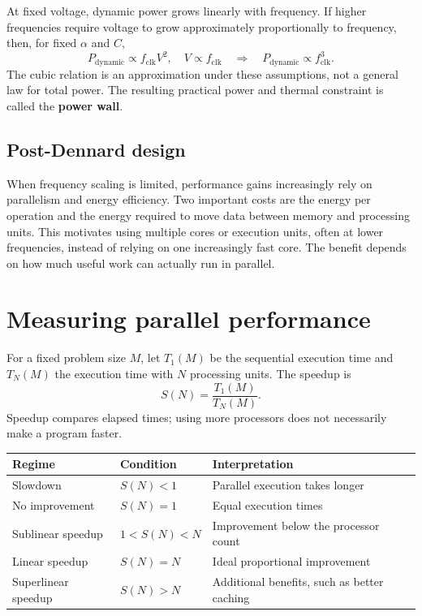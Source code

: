\documentclass[11pt,a4paper]{article}
\begin{document}
At fixed voltage, dynamic power grows linearly with frequency. If higher
frequencies require voltage to grow approximately proportionally to frequency,
then, for fixed $\alpha$ and $C$,
\[
  P_{\mathrm{dynamic}}\propto f_{\mathrm{clk}}V^2,
  \quad V\propto f_{\mathrm{clk}}
  \quad\Longrightarrow\quad P_{\mathrm{dynamic}}\propto f_{\mathrm{clk}}^3.
\]
The cubic relation is an approximation under these assumptions, not a general
law for total power. The resulting practical power and thermal constraint is
called the \textbf{power wall}.

\subsection{Post-Dennard design}
When frequency scaling is limited, performance gains increasingly rely on
parallelism and energy efficiency. Two important costs are the energy per
operation and the energy required to move data between memory and processing units.
This motivates using multiple cores or execution units, often at lower
frequencies, instead of relying on one increasingly fast core.
The benefit depends on how much useful work can actually run in parallel.

\newpage
\section{Measuring parallel performance}
For a fixed problem size $M$, let $T_1(M)$ be the sequential execution time
and $T_N(M)$ the execution time with $N$ processing units. The speedup is
\begin{equation}
  \boxed{S(N)=\frac{T_1(M)}{T_N(M)}.}
\end{equation}
Speedup compares elapsed times; using more processors does not necessarily
make a program faster.

\begin{center}
\begin{tabular}{@{}lll@{}}
\toprule
Regime & Condition & Interpretation\\
\midrule
Slowdown & $S(N)<1$ & Parallel execution takes longer\\
No improvement & $S(N)=1$ & Equal execution times\\
Sublinear speedup & $1<S(N)<N$ & Improvement below the processor count\\
Linear speedup & $S(N)=N$ & Ideal proportional improvement\\
Superlinear speedup & $S(N)>N$ & Additional benefits, such as better caching\\
\bottomrule
\end{tabular}
\end{center}
\end{document}
